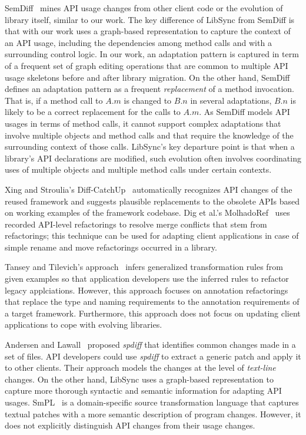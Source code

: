 \documentclass[runningheads,a4paper]{llncs}
\begin{document}
SemDiff~\cite{Dagenais2008:RAC} mines API usage changes from other client code or the evolution of library itself, similar to our work.  The key difference of {LibSync} from SemDiff is that with our work uses a graph-based representation to capture the context of an API usage, including the dependencies among method calls and with a surrounding control logic. In our work, an adaptation pattern is captured in term of a frequent set of graph editing operations that are common to multiple API usage skeletons before and after library migration. On the other hand, SemDiff defines an adaptation pattern as a frequent {\em replacement} of a method invocation. That is, if a method call to $A.m$ is changed to $B.n$ in several adaptations, $B.n$ is likely to be a correct replacement for the calls to $A.m$. As SemDiff models API usages in terms of method calls, it cannot support complex adaptations that involve multiple objects and method calls and that require the knowledge of the surrounding context of those calls. {LibSync}'s key departure point is that when a library's API declarations are modified, such evolution often involves coordinating uses of multiple objects and multiple method calls under certain contexts.

Xing and Stroulia's Diff-CatchUp~\cite{Xing2007:diffcatchup} automatically recognizes API changes of the reused framework and suggests plausible replacements to the obsolete APIs based on working examples of the framework codebase.  Dig et al.'s MolhadoRef~\cite{Dig2007} uses recorded API-level refactorings to resolve merge conflicts that stem from refactorings; this technique can be used for adapting client applications in case of simple rename and move refactorings occurred in a library.  

Tansey and Tilevich's approach~\cite{Tansey2008:composite} infers generalized transformation rules from given examples so that application developers use the inferred rules to refactor legacy applciations. However, this approach focuses on annotation refactorings that replace the type and naming requirements to the annotation requirements of a target framework. Furthermore, this approach does not focus on updating client applications to cope with evolving libraries. 

Andersen and Lawall~\cite{Andersen2008:patch} proposed {\em spdiff} that identifies common changes made in a set of files.  API developers could use {\em spdiff} to extract a generic patch and apply it to other clients. Their approach models the changes at the level of {\em text-line} changes. On the other hand, {LibSync} uses a graph-based representation to capture more thorough syntactic and semantic information for adapting API usages.  SmPL~\cite{Padioleau2007,Lawall2009:apienforce} is a domain-specific source transformation language that captures textual patches with a more semantic description of program changes. However, it does not explicitly distinguish API changes from their usage changes. 
\end{document}
